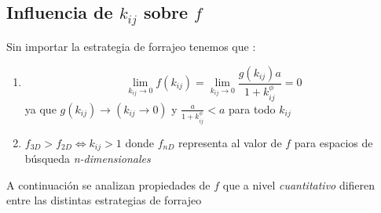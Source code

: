 \subsection{Influencia de $k_{ij}$ sobre $f$}\label{subsec:funcf}

Sin importar la estrategia de forrajeo tenemos que :
\begin{enumerate}[label=(\alph*)]
\item \begin{equation}
  \lim_{k_{ij} \to  0 }f(k_{ij}) = \lim_{k_{ij} \to 0 }\frac{g(k_{ij}) a}{1+k_{ij}^\phi} = 0 
\end{equation}
ya que $ g(k_{ij}) \to (k_{ij} \to 0)$ y $\frac{a}{1+k_{ij}^\phi} < a$  para todo $k_{ij}$

\item $f_{3D} > f_{2D} \iff k_{ij} > 1$ donde $f_{nD}$ representa al valor de $f$ para espacios de b\'usqueda \emph{n-dimensionales}
\end{enumerate}

A continuaci\'on se analizan propiedades de $f$ que a nivel \emph{cuantitativo} difieren entre las distintas estrategias de forrajeo






